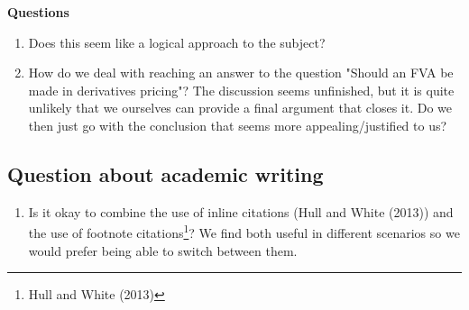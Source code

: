 \documentclass[10pt,a4paper]{article}
\begin{document}
        \textbf{Questions}
        \begin{enumerate}
            \item Does this seem like a logical approach to the subject?
            \item How do we deal with reaching an answer to the question "Should an FVA be made in derivatives pricing"? The discussion seems unfinished, but it is quite unlikely that we ourselves can provide a final argument that closes it. Do we then just go with the conclusion that seems more appealing/justified to us?
        \end{enumerate}

    \subsection{Question about academic writing}
        \begin{enumerate}
            \item Is it okay to combine the use of inline citations (Hull and White (2013)) and the use of footnote citations\footnote{Hull and White (2013)}? We find both useful in different scenarios so we would prefer being able to switch between them.
        \end{enumerate}
\end{document}

